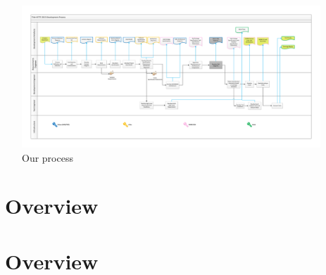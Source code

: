 \begin{figure}
    \includegraphics[width=\textwidth]{SwimLaneProcessDiagram.pdf}
    \caption{Our process}
    \label{fig:the_process}
\end{figure}

\clearpage

\section{\reveal\ Overview}


\section{\informed\ Overview}


